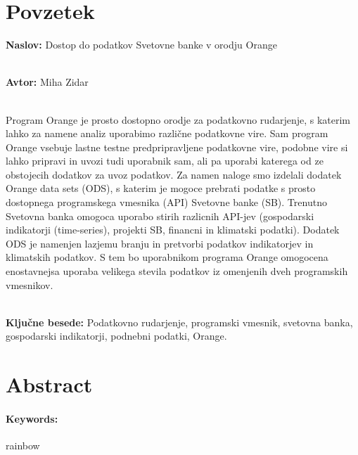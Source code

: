 \chapter*{Povzetek}


\textbf{Naslov:} Dostop do podatkov Svetovne banke v orodju Orange

\ \\
\textbf{Avtor:} Miha Zidar

\ \\
Program Orange je prosto dostopno orodje za podatkovno rudarjenje, s katerim
lahko za namene analiz uporabimo različne podatkovne vire. Sam program Orange
vsebuje lastne testne predpripravljene podatkovne vire, podobne vire si lahko 
pripravi in uvozi tudi uporabnik sam, ali pa uporabi katerega od ze obstojecih
dodatkov za uvoz podatkov. Za namen naloge smo izdelali dodatek Orange data sets (ODS),
s katerim je mogoce prebrati podatke s prosto dostopnega programskega vmesnika 
(API) Svetovne banke (SB). Trenutno Svetovna banka omogoca uporabo stirih razlicnih API-jev
(gospodarski indikatorji (time-series), projekti SB, financni in klimatski podatki). Dodatek ODS
je namenjen lazjemu branju in pretvorbi podatkov indikatorjev in klimatskih podatkov.
S tem bo uporabnikom programa Orange omogocena enostavnejsa uporaba velikega stevila
podatkov iz omenjenih dveh programskih vmesnikov.

\ \\
\textbf{Ključne besede:} Podatkovno rudarjenje, programski vmesnik, 
svetovna banka, gospodarski indikatorji, podnebni podatki, Orange. 




\clearemptydoublepage

\chapter*{Abstract}



\subsubsection*{Keywords:}

rainbow


